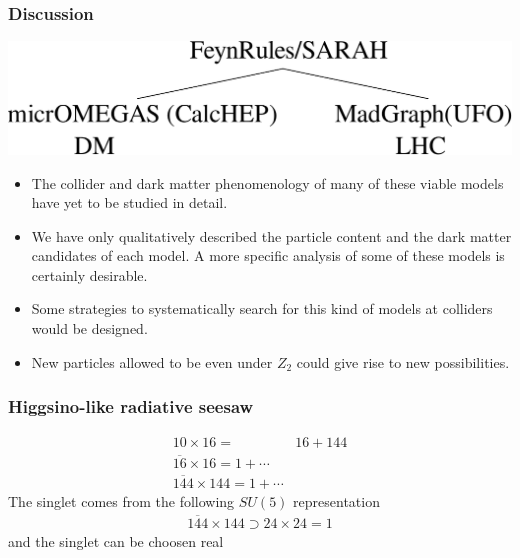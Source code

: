 \documentclass[%
xcolor=dvipsnames,table%
]{beamer}
\begin{document}



\begin{frame}
  \frametitle{Discussion}
\includegraphics[scale=0.6]{alg}
  \begin{itemize}
  \item The collider and dark matter phenomenology  of many of these viable models have yet to be studied in detail.
  \item We have only qualitatively described the particle content and the dark matter candidates of each model. A more specific analysis of some of these models is certainly desirable.
\item Some strategies to systematically search for this kind of models
  at colliders would be designed. 
  \item New particles allowed to be even under $Z_2$ could give rise to new possibilities.
  \end{itemize}
\end{frame}

\begin{frame}
  \frametitle{Higgsino-like radiative seesaw}
  \begin{align*}
    10\times 16=&16+144 \nonumber\\
    \overline{16}\times 16=1+\cdots \nonumber\\
    \overline{144}\times 144=1+\cdots
  \end{align*}
The singlet comes from the following $SU(5)$ representation
\begin{align*}
      \overline{144}\times 144\supset 24\times24=1
\end{align*}
and the singlet can be choosen real
\end{frame}
\end{document}
